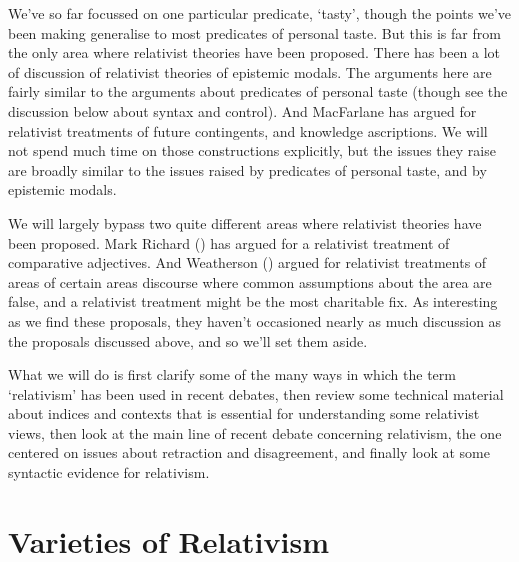 \documentclass[
  11pt,
  letterpaper,
  DIV=11,
  numbers=noendperiod,
  twoside]{scrartcl}
\begin{document}
We've so far focussed on one particular predicate, `tasty', though the
points we've been making generalise to most predicates of personal
taste. But this is far from the only area where relativist theories have
been proposed. There has been a lot of discussion of relativist theories
of epistemic modals. The arguments here are fairly similar to the
arguments about predicates of personal taste (though see the discussion
below about syntax and control). And MacFarlane has argued for
relativist treatments of future contingents, and knowledge ascriptions.
We will not spend much time on those constructions explicitly, but the
issues they raise are broadly similar to the issues raised by predicates
of personal taste, and by epistemic modals.

We will largely bypass two quite different areas where relativist
theories have been proposed. Mark Richard
() has argued for a relativist treatment
of comparative adjectives. And Weatherson
() argued for relativist
treatments of areas of certain areas discourse where common assumptions
about the area are false, and a relativist treatment might be the most
charitable fix. As interesting as we find these proposals, they haven't
occasioned nearly as much discussion as the proposals discussed above,
and so we'll set them aside.

What we will do is first clarify some of the many ways in which the term
`relativism' has been used in recent debates, then review some technical
material about indices and contexts that is essential for understanding
some relativist views, then look at the main line of recent debate
concerning relativism, the one centered on issues about retraction and
disagreement, and finally look at some syntactic evidence for
relativism.

\section{Varieties of Relativism}\label{varietiesofrelativism}
\end{document}
